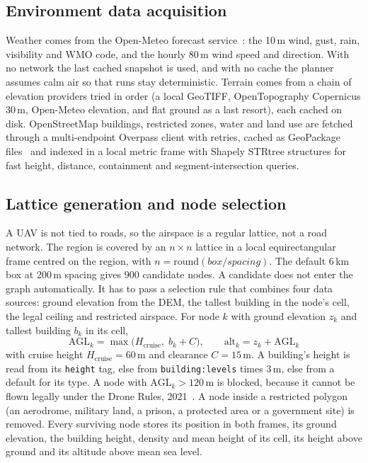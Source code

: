 \subsection{Environment data acquisition}

Weather comes from the Open-Meteo forecast service~\cite{r20}: the 10\,m wind, gust,
rain, visibility and WMO code, and the hourly 80\,m wind speed and direction. With no
network the last cached snapshot is used, and with no cache the planner assumes calm
air so that runs stay deterministic. Terrain comes from a chain of elevation providers
tried in order (a local GeoTIFF, OpenTopography Copernicus 30\,m, Open-Meteo elevation,
and flat ground as a last resort), each cached on disk. OpenStreetMap buildings,
restricted zones, water and land use are fetched through a multi-endpoint Overpass
client with retries, cached as GeoPackage files~\cite{r4} and indexed in a local metric
frame with Shapely STRtree structures for fast height, distance, containment and
segment-intersection queries.

\subsection{Lattice generation and node selection}

A UAV is not tied to roads, so the airspace is a regular lattice, not a road network.
The region is covered by an $n \times n$ lattice in a local equirectangular frame centred
on the region, with $n = \mathrm{round}(\mathit{box}/\mathit{spacing})$. The default
6\,km box at 200\,m spacing gives 900 candidate nodes. A candidate does not enter the
graph automatically. It has to pass a selection rule that combines four data sources: ground elevation from the DEM, the tallest building in
the node's cell, the legal ceiling and restricted airspace. For node $k$ with ground
elevation $z_k$ and tallest building $b_k$ in its cell,
\begin{equation}
  \mathrm{AGL}_k = \max\bigl(H_\mathrm{cruise},\; b_k + C\bigr), \qquad
  \mathrm{alt}_k = z_k + \mathrm{AGL}_k \label{eq:alt}
\end{equation}
with cruise height $H_\mathrm{cruise} = 60$\,m and clearance $C = 15$\,m. A building's
height is read from its \texttt{height} tag, else from \texttt{building:levels} times
3\,m, else from a default for its type. A node with $\mathrm{AGL}_k > 120$\,m is
blocked, because it cannot be flown legally under the Drone Rules, 2021~\cite{r21}. A
node inside a restricted polygon (an aerodrome, military land, a prison, a protected area
or a government site) is removed. Every surviving node stores its position in both
frames, its ground elevation, the building height, density and mean height of its cell,
its height above ground and its altitude above mean sea level.

